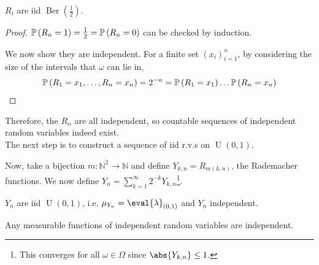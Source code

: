 \begin{claim}
	$R_i$ are iid $\operatorname{Ber}(\frac{1}{2})$.
\end{claim}

\begin{proof}
	$\mathbb{P}\left({R_n = 1}\right) = \frac{1}{2} = \mathbb{P}\left({R_n = 0}\right)$ can be checked by induction.

	We now show they are independent.
	For a finite set $(x_i)_{i=1}^n$, by considering the size of the intervals that $\omega$ can lie in,
	\begin{align*}
		\mathbb{P}\left({R_1 = x_1, \dots, R_n = x_n}\right) = 2^{-n} = \mathbb{P}\left({R_1 = x_1}\right) \dots \mathbb{P}\left({R_n = x_n}\right)
	\end{align*}
\end{proof}

Therefore, the $R_n$ are all independent, so countable sequences of independent random variables indeed exist. \\
The next step is to construct a sequence of iid r.v.s on $\operatorname{U}(0, 1)$.

Now, take a bijection $m \colon \mathbb N^2 \to \mathbb N$ and define $Y_{k,n} = R_{m(k, n)}$, the Rademacher functions.
We now define $Y_n = \sum_{k=1}^\infty 2^{-k} Y_{k,n}$\footnote{This converges for all $\omega \in \Omega$ since $\abs{Y_{k,n}} \leq 1$.}.

\begin{claim}
	$Y_n$ are iid $\operatorname{U}(0, 1)$, i.e. $\mu_{Y_n} = \eval{\lambda}_{(0, 1)}$ and $Y_n$ independent.
\end{claim}

\begin{lemma}
	Any measurable functions of independent random variables are independent.
\end{lemma}

